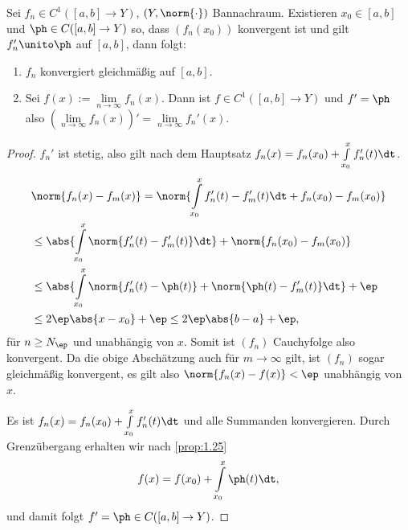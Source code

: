 \begin{prop}
\label{prop:1.26}
Sei $f_n\in C^1([a,b]\to Y)$, $(Y,\norm{\cdot})$ Bannachraum. Existieren
$x_0\in[a,b]$ und $\ph\in C([a,b]\to Y)$ so, dass $(f_n(x_0))$ konvergent ist
und gilt $f_n'\unito \ph$ auf $[a,b]$, dann folgt:
\begin{enumerate}
  \item $f_n$ konvergiert gleichmäßig auf $[a,b]$.
  \item Sei $f(x) := \lim\limits_{n\to \infty} f_n(x)$. Dann ist $f\in
  C^1([a,b]\to Y)$ und $f' = \ph$ also $\left(\lim\limits_{n\to \infty}
  f_n(x)\right)' = \lim\limits_{n\to \infty} f_n'(x)$.\fishhere
\end{enumerate}
\end{prop}
\begin{proof}
$f_n'$ ist stetig, also gilt nach dem Hauptsatz $f_n(x) = f_n(x_0) +
\int\limits_{x_0}^x f_n'(t)\dt$.
\begin{align*}
&\norm{f_n(x)-f_m(x)} = \norm{\int\limits_{x_0}^x f_n'(t) - f_m'(t) \dt + 
f_n(x_0) - f_m(x_0)} \\
&\le \abs{\int\limits_{x_0}^x \norm{f_n'(t) - f_m'(t)}\dt} + \norm{f_n(x_0) -
f_m(x_0)} \\
&\le \abs{\int\limits_{x_0}^x \norm{f_n'(t) - \ph(t)} + \norm{\ph(t)-
f_m'(t)}\dt} + \ep \\
&\le 2\ep\abs{x-x_0} + \ep \le 2\ep\abs{b-a} + \ep,
\end{align*}
für $n\ge N_\ep$ und unabhängig von $x$. Somit ist $(f_n)$ Cauchyfolge also
konvergent. Da die obige Abschätzung auch für $m\to\infty$ gilt, ist $(f_n)$
sogar gleichmäßig konvergent, es gilt also $\norm{f_n(x) - f(x)} < \ep$
unabhängig von $x$.

Es ist $f_n(x) = f_n(x_0) + \int\limits_{x_0}^x f_n'(t)\dt$ und alle Summanden
konvergieren. Durch Grenzübergang erhalten wir nach \ref{prop:1.25}
\begin{align*}
f(x) = f(x_0) + \int\limits_{x_0}^x \ph(t)\dt,
\end{align*}
und damit folgt $f' = \ph\in C([a,b]\to Y)$.\qedhere
\end{proof}

